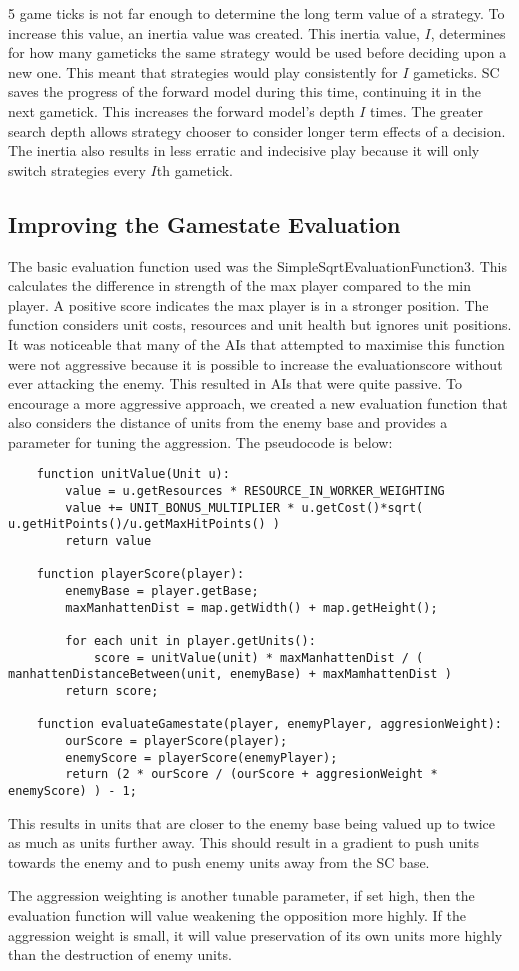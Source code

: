 \documentclass[]{article}
\begin{document}
5 game ticks is not far enough to determine the long term value of a strategy. To increase this value, an inertia value was created. This inertia value, $I$, determines for how many gameticks the same strategy would be used before deciding upon a new one. This meant that strategies would play consistently for $I$ gameticks. SC saves the progress of the forward model during this time, continuing it in the next gametick. This increases the forward model's depth $I$ times. The greater search depth allows strategy chooser to consider longer term effects of a decision. The inertia also results in less erratic and indecisive play because it will only switch strategies every $I$th gametick. 

\subsection{Improving the Gamestate Evaluation}
The basic evaluation function used was the SimpleSqrtEvaluationFunction3. This calculates the difference in  strength of the max player compared to the min player. A positive score indicates the max player is in a stronger position. The function considers unit costs, resources and unit health but ignores unit positions. It was noticeable that many of the AIs that attempted to maximise this function were not aggressive because it is possible to increase the evaluationscore without ever attacking the enemy. This resulted in AIs that were quite passive. To encourage a more aggressive approach, we created a new evaluation function that also considers the distance of units from the enemy base and provides a parameter for tuning the aggression. The pseudocode is below:
\begin{lstlisting}
	function unitValue(Unit u):
		value = u.getResources * RESOURCE_IN_WORKER_WEIGHTING
		value += UNIT_BONUS_MULTIPLIER * u.getCost()*sqrt( u.getHitPoints()/u.getMaxHitPoints() )
		return value
		
	function playerScore(player):
		enemyBase = player.getBase;
		maxManhattenDist = map.getWidth() + map.getHeight();
		
		for each unit in player.getUnits():
			score = unitValue(unit) * maxManhattenDist / ( manhattenDistanceBetween(unit, enemyBase) + maxMamhattenDist ) 
		return score;
	
	function evaluateGamestate(player, enemyPlayer, aggresionWeight):
		ourScore = playerScore(player);
		enemyScore = playerScore(enemyPlayer);
		return (2 * ourScore / (ourScore + aggresionWeight * enemyScore) ) - 1;
\end{lstlisting}
This results in units that are closer to the enemy base being valued up to twice as much as units further away. This should result in a gradient to push units towards the enemy and to push enemy units away from the SC base. 

The aggression weighting is another tunable parameter, if set high, then the evaluation function will value weakening the opposition more highly. If the aggression weight is small, it will value preservation of its own units more highly than the destruction of enemy units. 



\end{document}

